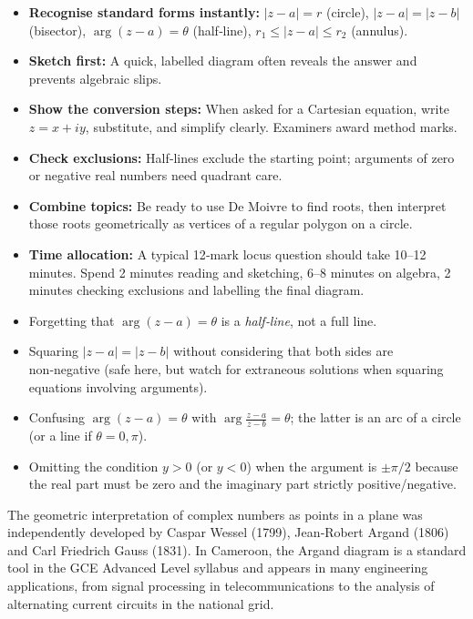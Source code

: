 \documentclass[11pt]{article}
\newcounter{popsec}
\newcounter{popsub}
\newcommand{\courssub}[1]{%
  \stepcounter{popsub}%
  \par\vspace{9pt}\noindent{\popxbold\fontsize{11.5}{13}\selectfont\color{popink}{\color{poporange}\thepopsec.\thepopsub}\hspace{6pt}#1}\par\nopagebreak\vspace{4pt}
}
\begin{document}
\courssub{Exam Technique and Time Management}

\begin{aretenir}
\begin{itemize}
\item \textbf{Recognise standard forms instantly:} $|z-a|=r$ (circle), $|z-a|=|z-b|$ (bisector), $\arg(z-a)=\theta$ (half‑line), $r_1\le|z-a|\le r_2$ (annulus).
\item \textbf{Sketch first:} A quick, labelled diagram often reveals the answer and prevents algebraic slips.
\item \textbf{Show the conversion steps:} When asked for a Cartesian equation, write $z=x+iy$, substitute, and simplify clearly.  Examiners award method marks.
\item \textbf{Check exclusions:} Half‑lines exclude the starting point; arguments of zero or negative real numbers need quadrant care.
\item \textbf{Combine topics:} Be ready to use De Moivre to find roots, then interpret those roots geometrically as vertices of a regular polygon on a circle.
\item \textbf{Time allocation:} A typical 12‑mark locus question should take 10–12 minutes.  Spend 2 minutes reading and sketching, 6–8 minutes on algebra, 2 minutes checking exclusions and labelling the final diagram.
\end{itemize}
\end{aretenir}

\begin{attention}
\begin{itemize}
\item Forgetting that $\arg(z-a)=\theta$ is a \emph{half‑line}, not a full line.
\item Squaring $|z-a|=|z-b|$ without considering that both sides are non‑negative (safe here, but watch for extraneous solutions when squaring equations involving arguments).
\item Confusing $\arg(z-a)=\theta$ with $\arg\frac{z-a}{z-b}=\theta$; the latter is an arc of a circle (or a line if $\theta=0,\pi$).
\item Omitting the condition $y>0$ (or $y<0$) when the argument is $\pm\pi/2$ because the real part must be zero and the imaginary part strictly positive/negative.
\end{itemize}
\end{attention}

\begin{savaistu}
The geometric interpretation of complex numbers as points in a plane was independently developed by Caspar Wessel (1799), Jean‑Robert Argand (1806) and Carl Friedrich Gauss (1831).  In Cameroon, the Argand diagram is a standard tool in the GCE Advanced Level syllabus and appears in many engineering applications, from signal processing in telecommunications to the analysis of alternating current circuits in the national grid.
\end{savaistu}
\end{document}
